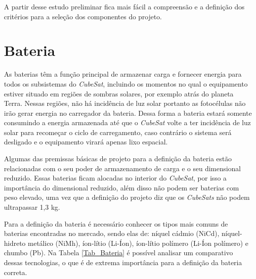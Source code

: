 \documentclass[
	12pt,				%
	openright,			%
	oneside,			%
	a4paper,			%
	english,			%
	french,				%
	spanish,			%
	brazil,				%
	oldfontcommands
	]{abntex2}
\begin{document}
	A partir desse estudo preliminar fica mais fácil a compreensão e a definição dos critérios para a seleção dos componentes do projeto.	
	
\section[Bateria]{Bateria} \label{Sec_Bateria}
	
As baterias têm a função principal de armazenar carga e fornecer energia para todos os subsistemas do \textit{CubeSat}, incluindo os momentos no qual o equipamento estiver situado em regiões de sombras solares, por exemplo atrás do planeta Terra. Nessas regiões, não há incidência de luz solar portanto as fotocélulas não irão gerar energia no carregador da bateria. Dessa forma a bateria estará somente consumindo a energia armazenada até que o \textit{CubeSat} volte a ter incidência de luz solar para recomeçar o ciclo de carregamento, caso contrário o sistema será desligado e o equipamento virará apenas lixo espacial.	
	
	Algumas das premissas básicas de projeto para a definição da bateria estão relacionadas com o seu poder de armazenamento de carga e o seu dimensional reduzido. Essas baterias ficam alocadas no interior do \textit{CubeSat}, por isso a importância do dimensional reduzido, além disso não podem ser baterias com peso elevado, uma vez que a definição do projeto diz que os \textit{CubeSats} não podem ultrapassar 1,3 kg.
	
	Para a definição da bateria é necessário conhecer os tipos mais comuns de baterias encontradas no mercado, sendo elas de: níquel cádmio (NiCd), níquel-hidreto metálico (NiMh), íon-lítio (Li-Íon), íon-lítio polímero (Li-Íon polímero) e chumbo (Pb). Na Tabela \ref{Tab_Bateria} é possível analisar um comparativo dessas tecnologias, o que é de extrema importância para a definição da bateria correta. 
		
\end{document}

